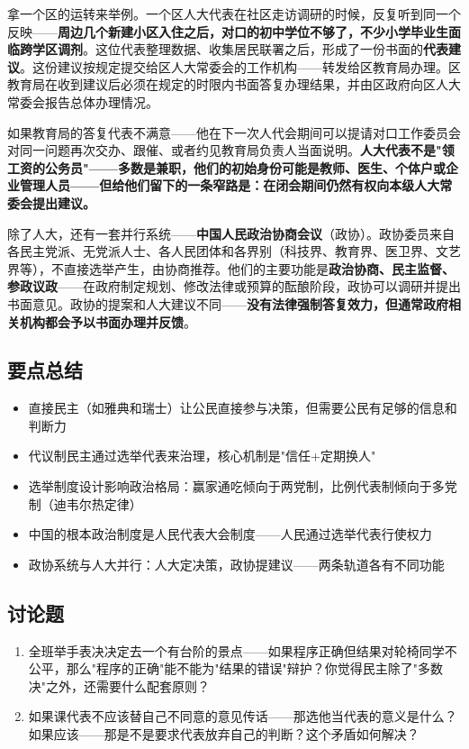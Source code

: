 \documentclass[a4paper,12pt]{ctexart}
\begin{document}
拿一个区的运转来举例。一个区人大代表在社区走访调研的时候，反复听到同一个反映——\textbf{周边几个新建小区入住之后，对口的初中学位不够了，不少小学毕业生面临跨学区调剂}。这位代表整理数据、收集居民联署之后，形成了一份书面的\textbf{代表建议}。这份建议按规定提交给区人大常委会的工作机构——转发给区教育局办理。区教育局在收到建议后必须在规定的时限内书面答复办理结果，并由区政府向区人大常委会报告总体办理情况。

如果教育局的答复代表不满意——他在下一次人代会期间可以提请对口工作委员会对同一问题再次交办、跟催、或者约见教育局负责人当面说明。\textbf{人大代表不是"领工资的公务员"——多数是兼职，他们的初始身份可能是教师、医生、个体户或企业管理人员——但给他们留下的一条窄路是：在闭会期间仍然有权向本级人大常委会提出建议。}

除了人大，还有一套并行系统——\textbf{中国人民政治协商会议}（政协）。政协委员来自各民主党派、无党派人士、各人民团体和各界别（科技界、教育界、医卫界、文艺界等），不直接选举产生，由协商推荐。他们的主要功能是\textbf{政治协商、民主监督、参政议政}——在政府制定规划、修改法律或预算的酝酿阶段，政协可以调研并提出书面意见。政协的提案和人大建议不同——\textbf{没有法律强制答复效力，但通常政府相关机构都会予以书面办理并反馈}。


\subsection*{要点总结}
\begin{itemize}
  \item 直接民主（如雅典和瑞士）让公民直接参与决策，但需要公民有足够的信息和判断力
  \item 代议制民主通过选举代表来治理，核心机制是"信任+定期换人"
  \item 选举制度设计影响政治格局：赢家通吃倾向于两党制，比例代表制倾向于多党制（迪韦尔热定律）
  \item 中国的根本政治制度是人民代表大会制度——人民通过选举代表行使权力
  \item 政协系统与人大并行：人大定决策，政协提建议——两条轨道各有不同功能
\end{itemize}

\subsection*{讨论题}
\begin{enumerate}
  \item 全班举手表决决定去一个有台阶的景点——如果程序正确但结果对轮椅同学不公平，那么"程序的正确"能不能为"结果的错误"辩护？你觉得民主除了"多数决"之外，还需要什么配套原则？
  \item 如果课代表不应该替自己不同意的意见传话——那选他当代表的意义是什么？如果应该——那是不是要求代表放弃自己的判断？这个矛盾如何解决？
\end{enumerate}
\end{document}
